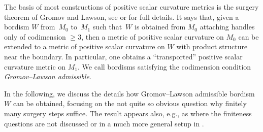 \documentclass[10pt,a4paper]{amsart}
\numberwithin{equation}{section}
\begin{document}
The basis of most constructions of positive scalar curvature metrics
is the surgery theorem of Gromov and Lawson, see
\cite{GromovLawson} or \cite{EbertFrenck} for full details. It says
that, given a bordism $W$ from~$M_0$ to~$M_1$ such that~$W$ is obtained from
$M_0$ attaching handles only of codimension $\ge 3$, then a metric of
positive scalar curvature on $M_0$ can be extended to a metric of positive
scalar curvature on $W$ with product structure near the boundary. In
particular, one obtains a ``transported'' positive scalar curvature metric
on $M_1$. We call bordisms satisfying the codimension condition
\emph{Gromov--Lawson admissible}.

In the following, we discuss the details how Gromov--Lawson admissible
bordism $W$ can be obtained, focusing on the not quite so obvious question
why finitely many surgery steps suffice. The result appears also, e.g., as
\cite[Theorem~2.2]{Rosenberg} where the finiteness questions are not
discussed or in a much more general setup in \cite[Appendix~2]{HebestreitJoachim}.
\end{document}
